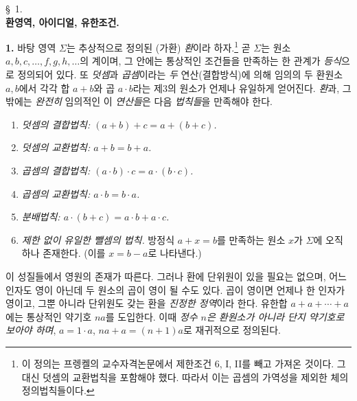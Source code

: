 \begin{center}
\S~1.\\[0.25em]
\textbf{환영역, 아이디얼, 유한조건.}
\end{center}

\textbf{1.} 바탕 영역 $\Sigma$는 추상적으로 정의된 (가환) \emph{환}이라 하자.\footnote{이 정의는 프렝켈의 교수자격논문에서 제한조건 6, I, II를 빼고 가져온 것이다. 그 대신 덧셈의 교환법칙을 포함해야 했다. 따라서 이는 곱셈의 가역성을 제외한 체의 정의법칙들이다.} 곧 $\Sigma$는 원소 $a,b,c,\ldots,f,g,h,\ldots$의 계이며, 그 안에는 통상적인 조건들을 만족하는 한 관계가 \emph{등식}으로 정의되어 있다. 또 \emph{덧셈}과 \emph{곱셈}이라는 \emph{두} 연산(결합방식)에 의해 임의의 두 환원소 $a,b$에서 각각 합 $a+b$와 곱 $a\cdot b$라는 제3의 원소가 언제나 유일하게 얻어진다. \emph{환}과, 그 밖에는 \emph{완전히} 임의적인 이 \emph{연산들}은 다음 \emph{법칙들}을 만족해야 한다.
\begin{enumerate}
\item \emph{덧셈의 결합법칙: $(a+b)+c=a+(b+c)$.}
\item \emph{덧셈의 교환법칙: $a+b=b+a$.}
\item \emph{곱셈의 결합법칙: $(a\cdot b)\cdot c=a\cdot(b\cdot c)$.}
\item \emph{곱셈의 교환법칙: $a\cdot b=b\cdot a$.}
\item \emph{분배법칙: $a\cdot(b+c)=a\cdot b+a\cdot c$.}
\item \emph{제한 없이 유일한 뺄셈의 법칙.} 방정식 $a+x=b$를 만족하는 원소 $x$가 $\Sigma$에 오직 하나 존재한다. (이를 $x=b-a$로 나타낸다.)
\end{enumerate}
이 성질들에서 영원의 존재가 따른다. 그러나 환에 단위원이 있을 필요는 없으며, 어느 인자도 영이 아닌데 두 원소의 곱이 영이 될 수도 있다. 곱이 영이면 언제나 한 인자가 영이고, 그뿐 아니라 단위원도 갖는 환을 \emph{진정한 정역}이라 한다. 유한합 $a+a+\cdots+a$에는 통상적인 약기호 $na$를 도입한다. 이때 \emph{정수 $n$은 환원소가 아니라 단지 약기호로 보아야 하며}, $a=1\cdot a$, $na+a=(n+1)a$로 재귀적으로 정의된다.

